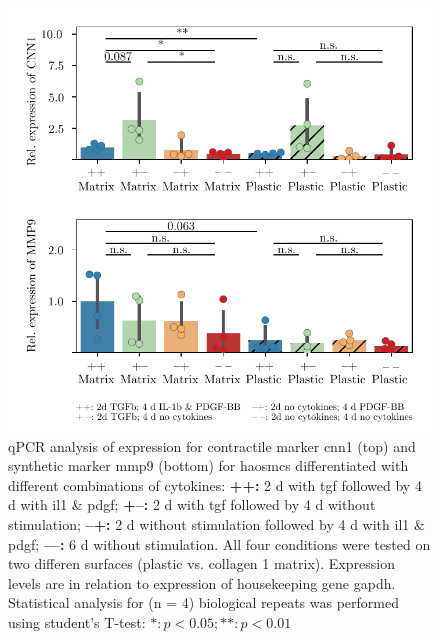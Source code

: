     \label{subsec:qPCR}
    \begin{figure}[h!]
    \capstart
        \centering
    	\includegraphics{Abbildung/qPCR.pdf}

    	\begin{minipage}{\captionwidth}
    		\caption[CNN_qPCR]{ \newline qPCR analysis of expression for contractile marker \ac{cnn1} (top) and synthetic marker \ac{mmp9} (bottom) for \acp{haosmc} differentiated with different combinations of cytokines:
            \textbf{++:} 2 d with \ac{tgf} followed by 4 d with \ac{il1} \& \ac{pdgf};
            \textbf{+–:} 2 d with \ac{tgf} followed by 4 d without stimulation;
            \textbf{–+:} 2 d without stimulation followed by 4 d with \ac{il1} \& \ac{pdgf};
            \textbf{––:} 6 d without stimulation.
            All four conditions were tested on two differen surfaces (plastic vs. collagen 1 matrix). Expression levels are in relation to expression of housekeeping gene \ac{gapdh}. Statistical analysis for (n = 4) biological repeats was performed using student's T-test: $*: p < 0.05; **: p < 0.01$}
    		\label{fig:qPCR}
    	\end{minipage}
    \end{figure}

